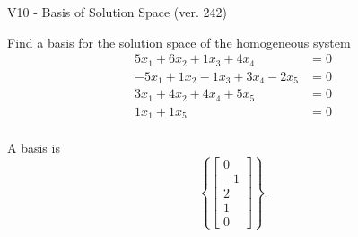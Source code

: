 \begin{exercise}
  \begin{exerciseTitle}V10 - Basis of Solution Space (ver. 242)\end{exerciseTitle}
  \begin{exerciseStatement}
    Find a basis for the solution space of the homogeneous system 
\begin{align*}
 5 x_ 1 + 6 x_ 2 + 1 x_ 3 + 4 x_ 4 &= 0  \\ 
  -5 x_ 1 + 1 x_ 2 -1 x_ 3 + 3 x_ 4 -2 x_ 5 &= 0  \\ 
  3 x_ 1 + 4 x_ 2 + 4 x_ 4 + 5 x_ 5 &= 0  \\ 
  1 x_ 1 + 1 x_ 5 &= 0  \\ 
 \end{align*}


 
  \end{exerciseStatement}

  \begin{exerciseAnswer}
   A basis is   
\[\left\{\left[\begin{array}{c}
0 \\
-1 \\
2 \\
1 \\
0
\end{array}\right]\right\}.\]

  


  \end{exerciseAnswer}
\end{exercise}